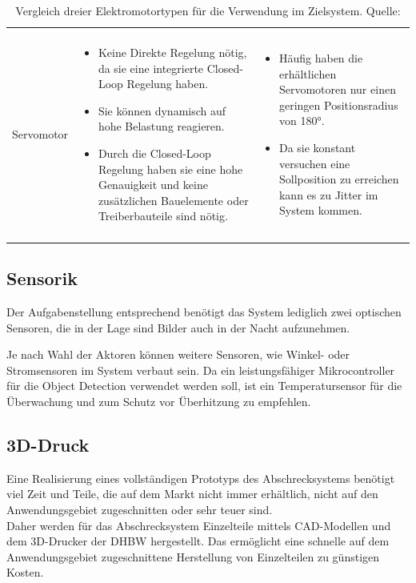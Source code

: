 \begin{longtable}{ p{}|p{}|p{} }
\begin{itemize}
    \end{itemize}
    \\
    Servomotor &
    \begin{itemize}
        \item Keine Direkte Regelung nötig, da sie eine integrierte Closed-Loop Regelung haben.
        \item Sie können dynamisch auf hohe Belastung reagieren.
        \item Durch die Closed-Loop Regelung haben sie eine hohe Genauigkeit und keine zusätzlichen Bauelemente oder Treiberbauteile sind nötig.
    \end{itemize}
    &
    \begin{itemize}
        \item Häufig haben die erhältlichen Servomotoren nur einen geringen Positionsradius von 180°.
        \item Da sie konstant versuchen eine Sollposition zu erreichen kann es zu Jitter im System kommen.
    \end{itemize}
    \\
    \caption{Vergleich dreier Elektromotortypen für die Verwendung im Zielsystem. Quelle: \cite{motors_seed}}
    \label{tab:el_motors}
\end{longtable}


\subsection{Sensorik}

Der Aufgabenstellung entsprechend benötigt das System lediglich zwei optischen Sensoren, die in der Lage sind Bilder auch in der Nacht aufzunehmen.

Je nach Wahl der Aktoren können weitere Sensoren, wie Winkel- oder Stromsensoren im System verbaut sein. Da ein leistungsfähiger Mikrocontroller für die Object Detection verwendet werden soll, ist ein Temperatursensor für die Überwachung und zum Schutz vor Überhitzung zu empfehlen.

\subsection{3D-Druck}

Eine Realisierung eines vollständigen Prototyps des Abschrecksystems benötigt viel Zeit und Teile, die auf dem Markt nicht immer erhältlich, nicht auf den Anwendungsgebiet zugeschnitten oder sehr teuer sind.\\
Daher werden für das Abschrecksystem Einzelteile mittels CAD-Modellen und dem 3D-Drucker der DHBW hergestellt. Das ermöglicht eine schnelle auf dem Anwendungsgebiet zugeschnittene Herstellung von Einzelteilen zu günstigen Kosten.

